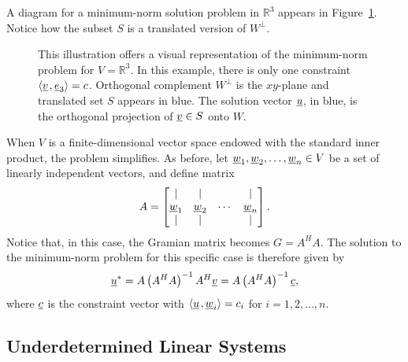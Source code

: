 A diagram for a minimum-norm solution problem in $\mathbb{R}^3$ appears in Figure~\ref{fig:AR-Dual1}.
Notice how the subset $S$ is a translated version of $W^{\bot}$.

\begin{figure}[hbt]
\centering{}
\caption{This illustration offers a visual representation of the minimum-norm problem for $V = \mathbb{R}^3$.
In this example, there is only one constraint ${\left\langle  \underline{v}  \mskip2mu ,  \underline{e}_3  \right\rangle} = c$.
Orthogonal complement $W^{\bot}$ is the $xy$-plane and translated set $S$ appears in blue.
The solution vector $\underline{u}$, in blue, is the orthogonal projection of $\underline{v} \in S$ onto $W$.}
\label{fig:AR-Dual1}
\end{figure}

\begin{example}
When $V$ is a finite-dimensional vector space endowed with the standard inner product, the problem simplifies.
As before, let $\underline{w}_1 ,\underline{w}_2 , \ldots, \underline{w}_n \in V$ be a set of linearly independent vectors,
and define matrix
\begin{equation*}
A = \begin{bmatrix} | & | & & | \\ \underline{w}_1 & \underline{w}_2 & \cdots & \underline{w}_n \\ | & | & & | \end{bmatrix} .
\end{equation*}
Notice that, in this case, the Gramian matrix becomes $G = A^H A$.
The solution to the minimum-norm problem for this specific case is therefore given by
\begin{equation*}
\underline{u}^* = A \left( A^H A \right)^{-1} A^H \underline{v} = A \left( A^H A \right)^{-1} \underline{c} ,
\end{equation*} 
where $\underline{c}$ is the constraint vector with ${\left\langle  \underline{u}  \mskip2mu ,  \underline{w}_i  \right\rangle} = c_i$ for $i=1, 2, \ldots, n$.
\end{example}


\subsection{Underdetermined Linear Systems}

